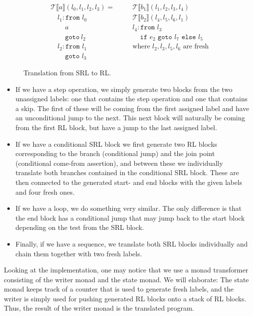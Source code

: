 \begin{figure}
$$\begin{aligned}
    & \mathcal{T}\llbracket a\rrbracket(l_0,l_1,l_2,l_3) =       & & \quad \mathcal{T}\llbracket b_1\rrbracket(l_1,l_2,l_3,l_4)\\
    & \quad l_1: \texttt{from }l_0                               & & \quad \mathcal{T}\llbracket b_2\rrbracket(l_4,l_5,l_6,l_1)\\
    & \quad \ \ \ \ \ a                                          & & \quad l_4: \texttt{from }l_3\\
    & \quad \ \ \ \ \ \texttt{goto} \ l_2                        & & \quad \ \ \ \ \ \texttt{if }e_2\texttt{ goto }l_7\texttt{ else }l_5\\
    & \quad l_2: \texttt{from } l_1                              & & \quad \text{where $l_2,l_3,l_5,l_6$ are fresh}\\
    & \quad \ \ \ \ \ \texttt{goto } l_3
  \end{aligned}$$
  \caption{Translation from SRL to RL.}
  \label{fig:translation_srl_to_rl}
\end{figure}
\begin{itemize}
  \item If we have a step operation, we simply generate two blocks from the two unassigned labels: one that contains the step operation and one that contains a skip. The first of these will be coming from the first assigned label and have an unconditional jump to the next. This next block will naturally be coming from the first RL block, but have a jump to the last assigned label.
  \item If we have a conditional SRL block we first generate two RL blocks corresponding to the branch (conditional jump) and the join point (conditional come-from assertion), and between these we individually translate both branches contained in the conditional SRL block. These are then connected to the generated start- and end blocks with the given labels and four fresh ones.
  \item If we have a loop, we do something very similar. The only difference is that the end block has a conditional jump that may jump back to the start block depending on the test from the SRL block.
  \item Finally, if we have a sequence, we translate both SRL blocks individually and chain them together with two fresh labels.
\end{itemize}
Looking at the implementation, one may notice that we use a monad transformer consisting of the writer monad and the state monad. We will elaborate: The state monad keeps track of a counter that is used to generate fresh labels, and the writer is simply used for pushing generated RL blocks onto a stack of RL blocks. Thus, the result of the writer monad is the translated program.




